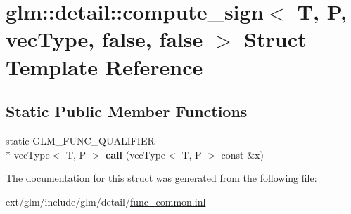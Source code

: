 \hypertarget{structglm_1_1detail_1_1compute__sign_3_01_t_00_01_p_00_01vec_type_00_01false_00_01false_01_4}{\section{glm\-:\-:detail\-:\-:compute\-\_\-sign$<$ T, P, vec\-Type, false, false $>$ Struct Template Reference}
\label{structglm_1_1detail_1_1compute__sign_3_01_t_00_01_p_00_01vec_type_00_01false_00_01false_01_4}
}
\subsection*{Static Public Member Functions}
\begin{DoxyCompactItemize}
\item 
\hypertarget{structglm_1_1detail_1_1compute__sign_3_01_t_00_01_p_00_01vec_type_00_01false_00_01false_01_4_a3d6c5553fb7cdb70bc5349b2b7c8c822}{static G\-L\-M\-\_\-\-F\-U\-N\-C\-\_\-\-Q\-U\-A\-L\-I\-F\-I\-E\-R \\*
vec\-Type$<$ T, P $>$ {\bfseries call} (vec\-Type$<$ T, P $>$ const \&x)}\label{structglm_1_1detail_1_1compute__sign_3_01_t_00_01_p_00_01vec_type_00_01false_00_01false_01_4_a3d6c5553fb7cdb70bc5349b2b7c8c822}

\end{DoxyCompactItemize}


The documentation for this struct was generated from the following file\-:\begin{DoxyCompactItemize}
\item 
ext/glm/include/glm/detail/\hyperlink{func__common_8inl}{func\-\_\-common.\-inl}\end{DoxyCompactItemize}
